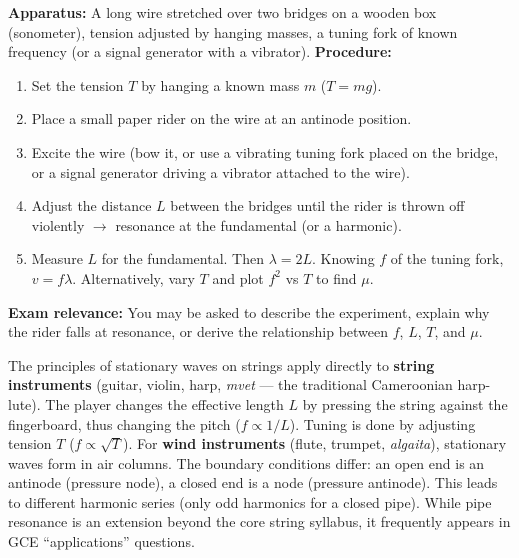 \documentclass[11pt]{article}
\begin{document}
\begin{experience}
\textbf{Apparatus:} A long wire stretched over two bridges on a wooden box (sonometer), tension adjusted by hanging masses, a tuning fork of known frequency (or a signal generator with a vibrator).
\textbf{Procedure:}
\begin{enumerate}
\item Set the tension $T$ by hanging a known mass $m$ ($T = mg$).
\item Place a small paper rider on the wire at an antinode position.
\item Excite the wire (bow it, or use a vibrating tuning fork placed on the bridge, or a signal generator driving a vibrator attached to the wire).
\item Adjust the distance $L$ between the bridges until the rider is thrown off violently $\rightarrow$ resonance at the fundamental (or a harmonic).
\item Measure $L$ for the fundamental. Then $\lambda = 2L$. Knowing $f$ of the tuning fork, $v = f\lambda$. Alternatively, vary $T$ and plot $f^2$ vs $T$ to find $\mu$.
\end{enumerate}
\textbf{Exam relevance:} You may be asked to describe the experiment, explain why the rider falls at resonance, or derive the relationship between $f$, $L$, $T$, and $\mu$.
\end{experience}

\begin{savaistu}
The principles of stationary waves on strings apply directly to \textbf{string instruments} (guitar, violin, harp, \emph{mvet} — the traditional Cameroonian harp-lute). The player changes the effective length $L$ by pressing the string against the fingerboard, thus changing the pitch ($f \propto 1/L$). Tuning is done by adjusting tension $T$ ($f \propto \sqrt{T}$).
For \textbf{wind instruments} (flute, trumpet, \emph{algaita}), stationary waves form in air columns. The boundary conditions differ: an open end is an antinode (pressure node), a closed end is a node (pressure antinode). This leads to different harmonic series (only odd harmonics for a closed pipe). While pipe resonance is an extension beyond the core string syllabus, it frequently appears in GCE ``applications'' questions.
\end{savaistu}
\end{document}
